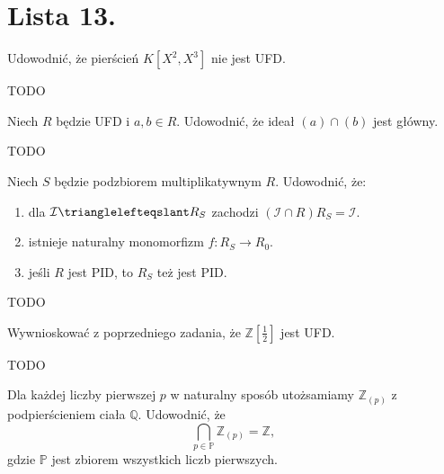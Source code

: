 \chapter{Lista 13.}

\begin{problem}[1]
		Udowodnić, że pierścień $K\left[ X^2, X^3 \right]$ nie jest UFD.     
\end{problem} 
\begin{solution}
    TODO
\end{solution} 
\begin{problem}[2]
    Niech $R$ będzie UFD i $a,b \in R$. Udowodnić, że ideał $\left( a \right) \cap \left( b \right)$ jest główny.   
\end{problem} 
\begin{solution}
    TODO
\end{solution} 
\begin{problem}[3]
    Niech $S$ będzie podzbiorem multiplikatywnym $R$. Udowodnić, że:
\begin{enumerate}[label=(\alph*)]
    \item dla $\mathcal{I} \trianglelefteqslant R_{S} $ zachodzi $\left( \mathcal{I}\cap R \right) R_{S} = \mathcal{I}$.
		\item istnieje naturalny monomorfizm $f: R_{S}\to R_{0}$.
		\item jeśli $R$ jest PID, to $R_{S}$ też jest PID.        
\end{enumerate}
\end{problem} 
\begin{solution}
    TODO
\end{solution} 
\begin{problem}[4]
    Wywnioskować z poprzedniego zadania, że $\mathbb{Z}\left[ \tfrac{1}{2}\right]$ jest UFD. 
\end{problem} 
\begin{solution}
    TODO
\end{solution} 
\begin{problem}[5]
    Dla każdej liczby pierwszej $p$ w naturalny sposób utożsamiamy $\mathbb{Z}_{(p)}$ z podpierścieniem ciała $\mathbb{Q}$. Udowodnić, że 
\[
    \bigcap_{p \in \mathbb{P}} \mathbb{Z}_{(p)} = \mathbb{Z}    
,\]   
    gdzie $\mathbb{P}$ jest zbiorem wszystkich liczb pierwszych. 
\end{problem} 
